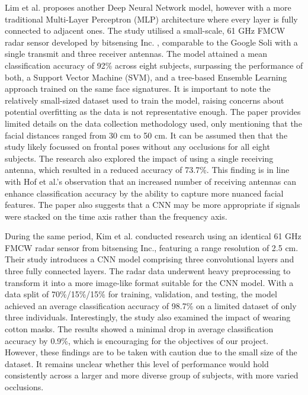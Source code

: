 \documentclass{interim}
\begin{document}
Lim et al. \cite{lim2020dnn} proposes another Deep Neural Network model, however with a more traditional Multi-Layer Perceptron (MLP) architecture where every layer is fully connected to adjacent ones. The study utilised a small-scale, 61 GHz FMCW radar sensor developed by bitsensing Inc. \cite{bitsensing2020bts60}, comparable to the Google Soli with a single transmit and three receiver antennas. The model attained a mean classification accuracy of 92\% across eight subjects, surpassing the performance of both, a Support Vector Machine (SVM), and a tree-based Ensemble Learning approach trained on the same face signatures. It is important to note the relatively small-sized dataset used to train the model, raising concerns about potential overfitting as the data is not representative enough. The paper provides limited details on the data collection methodology used, only mentioning that the facial distances ranged from 30 cm to 50 cm. It can be assumed then that the study likely focussed on frontal poses without any occlusions for all eight subjects. The research also explored the impact of using a single receiving antenna, which resulted in a reduced accuracy of 73.7\%. This finding is in line with Hof et al.'s \cite{hof2020face} observation that an increased number of receiving antennas can enhance classification accuracy by the ability to capture more nuanced facial features. The paper also suggests that a CNN may be more appropriate if signals were stacked on the time axis rather than the frequency axis.

During the same period, Kim et al. \cite{kim2020face} conducted research using an identical 61 GHz FMCW radar sensor from bitsensing Inc., featuring a range resolution of 2.5 cm. Their study introduces a CNN model comprising three convolutional layers and three fully connected layers. The radar data underwent heavy preprocessing to transform it into a more image-like format suitable for the CNN model. With a data split of 70\%/15\%/15\% for training, validation, and testing, the model achieved an average classification accuracy of 98.7\% on a limited dataset of only three individuals. Interestingly, the study also examined the impact of wearing cotton masks. The results showed a minimal drop in average classification accuracy by 0.9\%, which is encouraging for the objectives of our project. However, these findings are to be taken with caution due to the small size of the dataset. It remains unclear whether this level of performance would hold consistently across a larger and more diverse group of subjects, with more varied occlusions.
\end{document}
